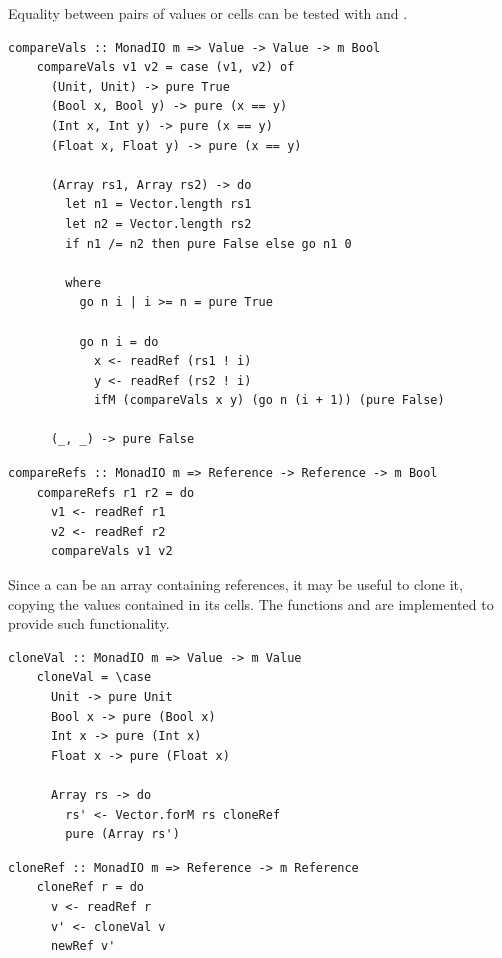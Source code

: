 \documentclass[UdineBachThesis,american,11pt,draft]{PhdThesis}
\begin{document}
  Equality between pairs of values or cells can be tested with
  \lstinline@compareVals@ and \lstinline@compareRefs@.

  \begin{lstlisting}[gobble=4,basicstyle=\ttfamily\small]
    compareVals :: MonadIO m => Value -> Value -> m Bool
    compareVals v1 v2 = case (v1, v2) of
      (Unit, Unit) -> pure True
      (Bool x, Bool y) -> pure (x == y)
      (Int x, Int y) -> pure (x == y)
      (Float x, Float y) -> pure (x == y)

      (Array rs1, Array rs2) -> do
        let n1 = Vector.length rs1
        let n2 = Vector.length rs2
        if n1 /= n2 then pure False else go n1 0

        where
          go n i | i >= n = pure True

          go n i = do
            x <- readRef (rs1 ! i)
            y <- readRef (rs2 ! i)
            ifM (compareVals x y) (go n (i + 1)) (pure False)

      (_, _) -> pure False
  \end{lstlisting}

  \begin{lstlisting}[gobble=4,basicstyle=\ttfamily\small]
    compareRefs :: MonadIO m => Reference -> Reference -> m Bool
    compareRefs r1 r2 = do
      v1 <- readRef r1
      v2 <- readRef r2
      compareVals v1 v2
  \end{lstlisting}

  Since a \lstinline@Value@ can be an array containing references, it may be
  useful to clone it, copying the values contained in its cells. The functions
  \lstinline@cloneVal@ and \lstinline@cloneRef@ are implemented to provide such
  functionality.

  \begin{lstlisting}[gobble=4,basicstyle=\ttfamily\small]
    cloneVal :: MonadIO m => Value -> m Value
    cloneVal = \case
      Unit -> pure Unit
      Bool x -> pure (Bool x)
      Int x -> pure (Int x)
      Float x -> pure (Float x)

      Array rs -> do
        rs' <- Vector.forM rs cloneRef
        pure (Array rs')
  \end{lstlisting}

  \begin{lstlisting}[gobble=4,basicstyle=\ttfamily\small]
    cloneRef :: MonadIO m => Reference -> m Reference
    cloneRef r = do
      v <- readRef r
      v' <- cloneVal v
      newRef v'
  \end{lstlisting}
\end{document}
